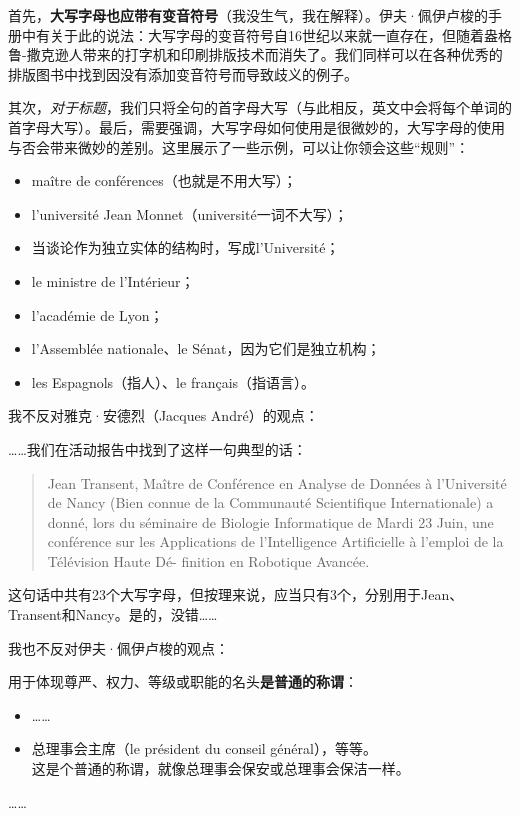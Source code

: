 首先，\textbf{大写字母也应带有变音符号}（我没生气，我在解释）。伊夫·佩伊卢梭的手册中有关于此的说法：大写字母的变音符号自16世纪以来就一直存在，但随着盎格鲁-撒克逊人带来的打字机和印刷排版技术而消失了。我们同样可以在各种优秀的排版图书中找到因没有添加变音符号而导致歧义的例子。

其次，\emph{对于标题}，我们只将全句的首字母大写（与此相反，英文中会将每个单词的首字母大写）。最后，需要强调，大写字母如何使用是很微妙的，大写字母的使用与否会带来微妙的差别。这里展示了一些示例，可以让你领会这些“规则”：

\begin{itemize}
    \item maître de conférences（也就是不用大写）；
    \item l'université Jean Monnet（université一词不大写）；
    \item 当谈论作为独立实体的结构时，写成l'Université；
    \item le ministre de l'Intérieur；
    \item l'académie de Lyon；
    \item l'Assemblée nationale、le Sénat，因为它们是独立机构；
    \item les Espagnols（指人）、le français（指语言）。
\end{itemize}

我不反对雅克·安德烈（Jacques André）的观点：

\begin{origincitation}[雅克·安德烈{[2]}]
    ……我们在活动报告中找到了这样一句典型的话：
    
    \begin{quote}
        Jean Transent, Maître de Conférence en Analyse de Données à l'Université de Nancy (Bien connue de la Communauté Scientifique Internationale) a donné, lors du séminaire de Biologie Informatique de Mardi 23 Juin, une conférence sur les Applications de l'Intelligence Artificielle à l'emploi de la Télévision Haute Dé- finition en Robotique Avancée.
    \end{quote}

    这句话中共有23个大写字母，但按理来说，应当只有3个，分别用于Jean、Transent和Nancy。是的，没错……
\end{origincitation}

我也不反对伊夫·佩伊卢梭的观点：

\begin{origincitation}[伊夫·佩伊卢梭{[13]}]
    用于体现尊严、权力、等级或职能的名头\textbf{是普通的称谓}：
    \begin{itemize}
        \item ……
        \item 总理事会主席（le président du conseil général），等等。\\\textsf{这是个普通的称谓，就像总理事会保安或总理事会保洁一样。}%
    \end{itemize}%

    ……
\end{origincitation}

